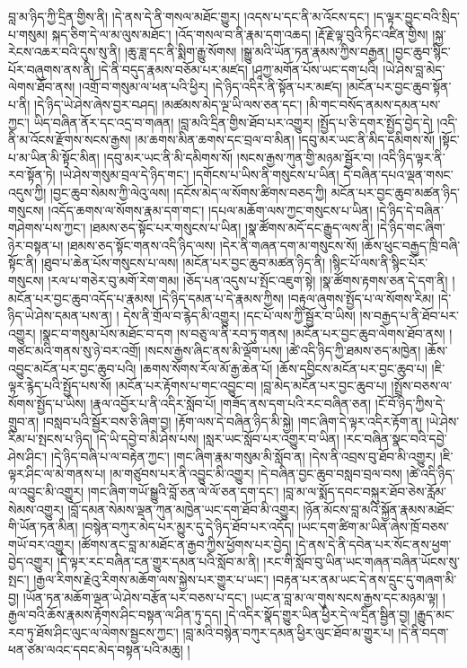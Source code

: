 བླ་མ་ཉིད་ཀྱི་དྲིན་གྱིས་ནི། །དེ་ནས་དེ་ནི་གསལ་མཐོང་གྱུར། །འདས་པ་དང་ནི་མ་འོངས་དང་། །ད་ལྟར་བྱུང་བའི་སྲིད་པ་གསུམ། སྐད་ཅིག་དེ་ལ་མ་ལུས་མཐོང་། །འོད་གསལ་བ་ནི་རྣམ་དག་འཆད། །རྡོ་རྗེ་ལྟ་བུའི་ཏིང་འཛིན་གྱིས། །སྐྱ་རེངས་འཆར་བའི་དུས་སུ་ནི། །ཆུ་ཟླ་དང་ནི་སྨིག་རྒྱུ་སོགས། །སྒྱུ་མའི་ཡོན་ཏན་རྣམས་ཀྱིས་བརྒྱན། །བྱང་ཆུབ་སྙིང་པོར་བཞུགས་ནས་ནི། །དེ་ནི་བདུད་རྣམས་བཅོམ་པར་མཛད། །ཤཱཀྱ་མགོན་པོས་ཡང་དག་པའི། །ཡེ་ཤེས་བླ་མེད་ལེགས་ཐོབ་ནས། །འགྲོ་བ་གསུམ་ལ་ཕན་པའི་ཕྱིར། །དེ་ཉིད་འདིར་ནི་སྟོན་པར་མཛད། །མངོན་པར་བྱང་ཆུབ་སྟོན་པ་ནི། །དེ་ཉིད་ཡེ་ཤེས་ཞེས་བྱར་བཤད། །མཚམས་མེད་ལྔ་ཡི་ལས་ཅན་དང་། །མི་གང་བསོད་ནམས་དམན་པས་ཀྱང་། ཡིད་བཞིན་ནོར་དང་འདྲ་བ་གཞན། །བླ་མའི་དྲིན་གྱིས་ཐོབ་པར་འགྱུར། །སྤྱོད་པ་ཅི་དགར་སྤྱོད་བྱེད་དེ། །འདི་ནི་མ་འོངས་རྫོགས་སངས་རྒྱས། །མ་ཆགས་མིན་ཆགས་དང་བྲལ་བ་མིན། །དབུ་མར་ཡང་ནི་མིད་དམིགས་སོ། །སྟོང་པ་མ་ཡིན་མི་སྟོང་མིན། །དབུ་མར་ཡང་ནི་མི་དམིགས་སོ། །སངས་རྒྱས་ཀུན་གྱི་མཉམ་སྦྱོར་བ། །འདི་ཉིད་ལྟར་ནི་རབ་སྟོན་ཏེ། །ཡེ་ཤེས་གསུམ་བྲལ་དེ་ཉིད་གང་། །དགོངས་པ་ཡིས་ནི་གསུངས་པ་ཡིན། དེ་བཞིན་དཔའ་ལྡན་གསང་འདུས་ཀྱི། །བྱང་ཆུབ་སེམས་ཀྱི་ལེའུ་ལས། །དངོས་མེད་ལ་སོགས་ཚིགས་བཅད་ཀྱི། མངོན་པར་བྱང་ཆུབ་མཚན་ཉིད་གསུངས། །འདོད་ཆགས་ལ་སོགས་རྣམ་དག་གང་། །དཔལ་མཆོག་ལས་ཀྱང་གསུངས་པ་ཡིན། །དེ་ཉིད་དེ་བཞིན་གཤེགས་པས་ཀྱང་། །ཐམས་ཅད་སྟོང་པར་གསུངས་པ་ཡིན། །སྣ་ཚོགས་མདོ་དང་རྒྱུད་ལས་ནི། །དེ་ཉིད་གང་ཞིག་ཉེར་བསྟན་པ། །ཐམས་ཅད་སྟོང་གནས་འདི་ཉིད་ལས། །དེར་ནི་གཞན་དག་མ་གསུངས་སོ། །ཆོས་ཕུང་བརྒྱད་ཁྲི་བཞི་སྟོང་ནི། །ཐུབ་པ་ཆེན་པོས་གསུངས་པ་ལས། །མངོན་པར་བྱང་ཆུབ་མཚན་ཉིད་ནི། །སྙིང་པོ་ལས་ནི་སྙིང་པོར་གསུངས། །རལ་པ་གཅེར་བུ་མགོ་རེག་གམ། །ཅོད་པན་འདུས་པ་སྤོང་འཇུག་སྟེ། །སྣ་ཚོགས་རྟགས་ཅན་དེ་དག་ནི། །མངོན་པར་བྱང་ཆུབ་འདོད་པ་རྣམས། །དེ་ཉིད་དམན་པ་དེ་རྣམས་ཀྱིས། །བརྟུལ་ཞུགས་སྤྱོད་པ་ལ་སོགས་རིམ། །དེ་ཉིད་ཡེ་ཤེས་དམན་པས་ན། །
དེས་ནི་གྲོལ་བ་རྙེད་མི་འགྱུར། །དང་པོ་ལས་ཀྱི་སྦྱོར་བ་ཡིས། །ས་བརྒྱད་པ་ནི་ཐོབ་པར་འགྱུར། །སྣང་བ་གསུམ་པོས་མཐོང་བ་དག །ས་བཅུ་ལ་ནི་རབ་ཏུ་གནས། །མངོན་པར་བྱང་ཆུབ་ལེགས་ཐོབ་ནས། །གཙང་མའི་གནས་སུ་ཉེ་བར་འགྲོ། །སངས་རྒྱས་ཞིང་ནས་མི་ལྡོག་པས། །ཚེ་འདི་ཉིད་ཀྱི་ཐམས་ཅད་མཁྱེན། །ཆོས་འབྱུང་མངོན་པར་བྱང་ཆུབ་པའི། །ཆགས་སོགས་རོལ་མོ་རྒྱ་ཆེན་པོ། །ཆོས་དབྱིངས་མངོན་པར་བྱང་ཆུབ་པ། །ཇི་ལྟར་རྙེད་པའི་སྤྱོད་པས་སོ། །མངོན་པར་རྟོགས་པ་གང་འབྱུང་བ། །བླ་མེད་མངོན་པར་བྱང་ཆུབ་པ། །སྤྲོས་བཅས་ལ་སོགས་སྤྱོད་པ་ཡིས། །རྣལ་འབྱོར་པ་ནི་འདིར་སློབ་པོ། །གཟོད་ནས་དག་པའི་རང་བཞིན་ཅན། །ངོ་བོ་ཉིད་ཀྱིས་དེ་གྲུབ་ན། །བསླབ་པའི་སྦྱོར་བས་ཅི་ཞིག་བྱ། །རྟོག་ལས་དེ་བཞིན་ཉིད་མི་སྐྱེ། །གང་ཞིག་དེ་ལྟར་འདིར་རྟོག་ན། །ཡེ་ཤེས་རིམ་པ་སྤངས་པ་ཉིད། །དེ་ཡི་དབྱེ་བ་མི་ཤེས་པས། །སླར་ཡང་སློབ་པར་འགྱུར་བ་ཡིན། །རང་བཞིན་སྣང་བའི་དབྱེ་ཤེས་ཤིང་། །དེ་ཉིད་བཞི་པ་ལ་བརྟེན་ཀྱང་། །གང་ཞིག་རྣམ་གསུམ་མི་སློབ་ན། །དེས་ནི་འབྲས་བུ་ཐོབ་མི་འགྱུར། །ཇི་ལྟར་ཤིང་ལ་མེ་གནས་པ། །མ་གཙུབས་པར་ནི་འབྱུང་མི་འགྱུར། །དེ་བཞིན་བྱང་ཆུབ་བསླབ་བྲལ་བས། །ཚེ་འདི་ཉིད་ལ་འབྱུང་མི་འགྱུར། །གང་ཞིག་གཡོ་སྒྱུའི་བློ་ཅན་ལེ་ལོ་ཅན་དག་དང་། །བླ་མ་ལ་སྨོད་དབང་བསྐུར་ཐོབ་ཅེས་རློམ་སེམས་འགྱུར། །བློ་དམན་སེམས་ལྡན་ཀུན་མཁྱེན་ཡང་དག་ཐོབ་མི་འགྱུར། །ཉོན་མོངས་བླ་མའི་སྐྱོན་རྣམས་མཐོང་གི་ཡོན་ཏན་མིན། །བསྙེན་བཀུར་མེད་པར་མྱུར་དུ་དེ་ཉིད་ཐོབ་པར་འདོད། །ཡང་དག་ཚིག་མ་ཡིན་ཞེས་ཁྲོ་བཅས་གཡོ་བར་འགྱུར། །ཚོགས་ནང་བླ་མ་མཐོང་ན་རྒྱབ་ཀྱིས་ཕྱོགས་པར་བྱེད། །དེ་ནས་དེ་ནི་དབེན་པར་སོང་ནས་ཕྱག་བྱེད་འགྱུར། །དེ་ལྟར་རང་བཞིན་ངན་གྱུར་དམན་པའི་སློབ་མ་ནི། །རང་གི་སློབ་བུ་ཡིན་ཡང་གཞན་བཞིན་ཡོངས་སུ་སྤང་། །རྒྱལ་རིགས་རྗེའུ་རིགས་མཆོག་ལས་སྐྱེས་པར་གྱུར་པ་ཡང་། །བརྟན་པར་ནམ་ཡང་དེ་ནས་དྲུང་དུ་གཞག་མི་བྱ། །ཡོན་ཏན་མཆོག་ལྡན་ཡེ་ཤེས་བརྩོན་པར་བཅས་པ་དང་། །ཡང་ན་བླ་མ་ལ་གུས་སངས་རྒྱས་དང་མཉམ་ལྟ། །རྒྱལ་བའི་ཆོས་རྣམས་རྟོགས་ཤིང་བསྟན་ལ་ཤིན་ཏུ་དད། །དེ་འདིར་སྣོད་གྱུར་ཡིན་ཕྱིར་དེ་ལ་དྲིན་སྦྱིན་བྱ། །རྒྱུད་མང་རབ་ཏུ་ཐོས་ཤིང་ལུང་ལ་ལེགས་སྦྱངས་ཀྱང་། །བླ་མའི་བསྙེན་བཀུར་དམན་ཕྱིར་ལུང་ཐོབ་མ་གྱུར་པ། །དེ་ནི་བདག་ཕན་ཙམ་ལའང་དབང་མེད་བསྟན་པའི་མཆུ། །
